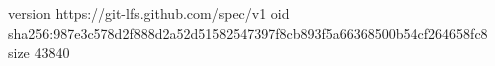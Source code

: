 version https://git-lfs.github.com/spec/v1
oid sha256:987e3c578d2f888d2a52d51582547397f8cb893f5a66368500b54cf264658fc8
size 43840
